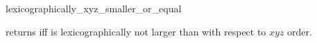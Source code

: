 \begin{ccRefFunction}{lexicographically_xyz_smaller_or_equal}

{returns  iff  is lexicographically not larger
than  with respect to $xyz$ order.}

\ccSeeAlso
{} \\
 \\

\end{ccRefFunction}

